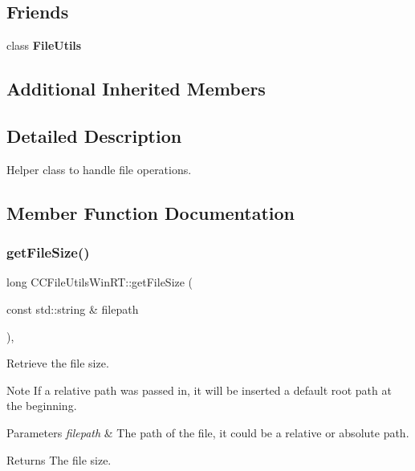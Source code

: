 \subsection*{Friends}
\begin{DoxyCompactItemize}
\item 
\mbox{\label{classCCFileUtilsWinRT_a6dbe7ca774e78da4f740d18287a14042}} 
class {\bfseries File\+Utils}
\end{DoxyCompactItemize}
\subsection*{Additional Inherited Members}


\subsection{Detailed Description}
Helper class to handle file operations. 

\subsection{Member Function Documentation}
\mbox{\label{classCCFileUtilsWinRT_a56b2cacd3791ebf132e90b5abce17db3}} 
\subsubsection{\texorpdfstring{get\+File\+Size()}{getFileSize()}}
{\footnotesize\ttfamily long C\+C\+File\+Utils\+Win\+R\+T\+::get\+File\+Size (\begin{DoxyParamCaption}\item[{const std\+::string \&}]{filepath }\end{DoxyParamCaption})\hspace{0.3cm}{\ttfamily [override]}, {\ttfamily [virtual]}}

Retrieve the file size.

\begin{DoxyNote}{Note}
If a relative path was passed in, it will be inserted a default root path at the beginning. 
\end{DoxyNote}

\begin{DoxyParams}{Parameters}
{\em filepath} & The path of the file, it could be a relative or absolute path. \\
\hline
\end{DoxyParams}
\begin{DoxyReturn}{Returns}
The file size. 
\end{DoxyReturn}


